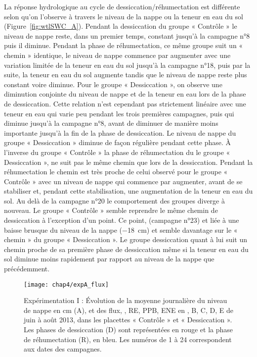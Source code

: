 La réponse hydrologique au cycle de dessiccation/réhumectation est différente selon qu'on l'observe à travers le niveau de la nappe ou la teneur en eau du sol (Figure~\ref{fig:wtlSWC_A}).
Pendant la dessiccation du groupe « Contrôle » le niveau de nappe reste, dans un premier temps, constant jusqu'à la campagne n°8 puis il diminue. 
Pendant la phase de réhumectation, ce même groupe suit un « chemin » identique, le niveau de nappe commence par augmenter avec une variation limitée de la teneur en eau du sol jusqu'à la campagne n°18, puis par la suite, la teneur en eau du sol augmente tandis que le niveau de nappe reste plus constant voire diminue.
Pour le groupe « Dessiccation », on observe une diminution conjointe du niveau de nappe et de la teneur en eau lors de la phase de dessiccation.
Cette relation n'est cependant pas strictement linéaire avec une teneur en eau qui varie peu pendant les trois premières campagnes, puis qui diminue jusqu'à la campagne n°8, avant de diminuer de manière moins importante jusqu'à la fin de la phase de dessiccation.
Le niveau de nappe du groupe « Dessiccation » diminue de façon régulière pendant cette phase.
À l'inverse du groupe « Contrôle » la phase de réhumectation du le groupe « Dessiccation », ne suit pas le même chemin que lors de la dessiccation.
Pendant la réhumectation le chemin est très proche de celui observé pour le groupe « Contrôle » avec un niveau de nappe qui commence par augmenter, avant de se stabiliser et, pendant cette stabilisation, une augmentation de la teneur en eau du sol.
Au delà de la campagne n°20 le comportement des groupes diverge à nouveau.
Le groupe « Contrôle » semble reprendre le même chemin de dessiccation à l'exception d'un point.
Ce point, (campagne n°23) et liée à une baisse brusque du niveau de la nappe (\SI{-18}{\centi\metre}) et semble davantage sur le « chemin » du groupe « Dessiccation ».
Le groupe dessiccation quant à lui suit un chemin proche de sa première phase de dessiccation même si la teneur en eau du sol diminue moins rapidement par rapport au niveau de la nappe que précédemment.


\begin{figure}
\centering
\texttt{[image: chap4/expA\_flux]}
\caption{Expérimentation I : Évolution de la moyenne journalière du niveau de nappe en cm (A), et des flux, \chh, RE, PPB, ENE en \si{\uml}, B, C, D, E de juin à août 2013, dans les placettes « Contrôle » et « Dessiccation ». Les phases de dessiccation (D) sont représentées en rouge et la phase de réhumectation (R), en bleu. Les numéros de 1 à 24 correspondent aux dates des campagnes.}
\label{fig:HMzi}
\end{figure}

